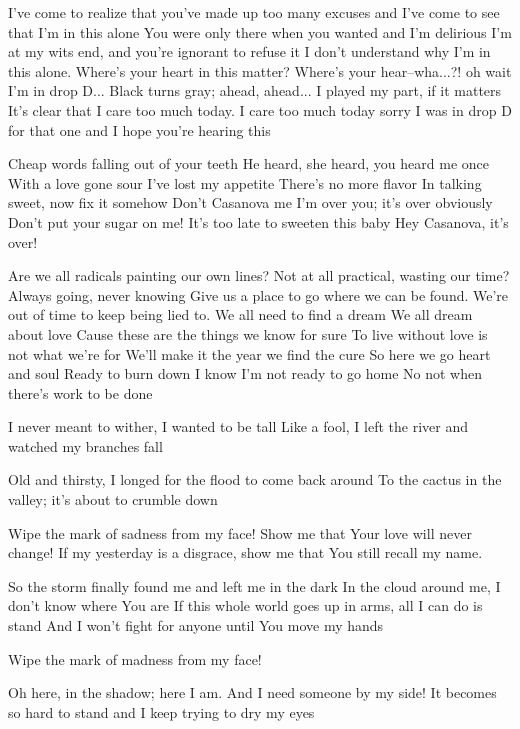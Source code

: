 I've come to realize that you've made up too many excuses
and I've come to see that I'm in this alone
You were only there when you wanted and I'm delirious
I'm at my wits end, and you're ignorant to refuse it
I don't understand why I'm in this alone.
Where's your heart in this matter?
Where's your hear--wha...?! oh wait I'm in drop D...
Black turns gray; ahead, ahead...
I played my part, if it matters
It's clear that I care too much today.
I care too much today
sorry I was in drop D for that one
and I hope you're hearing this


Cheap words falling out of your teeth
He heard, she heard, you heard me once
With a love gone sour
I've lost my appetite
There's no more flavor
In talking sweet, now fix it somehow
Don't Casanova me
I'm over you; it's over obviously
Don't put your sugar on me!
It's too late to sweeten this baby
Hey Casanova, it's over!


Are we all radicals painting our own lines?
Not at all practical, wasting our time?
Always going, never knowing
Give us a place to go where we can be found.
We're out of time to keep being lied to.
We all need to find a dream
We all dream about love
Cause these are the things we know for sure
To live without love is not what we're for
We'll make it the year we find the cure
So here we go heart and soul
Ready to burn down
I know I'm not ready to go home
No not when there's work to be done


I never meant to wither, I wanted to be tall
Like a fool, I left the river and watched my branches fall

Old and thirsty, I longed for the flood to come back around
To the cactus in the valley; it's about to crumble down

Wipe the mark of sadness from my face!
Show me that Your love will never change!
If my yesterday is a disgrace, show me that You still recall my name.

So the storm finally found me and left me in the dark
In the cloud around me, I don’t know where You are
If this whole world goes up in arms, all I can do is stand
And I won’t fight for anyone until You move my hands

Wipe the mark of madness from my face!

Oh here, in the shadow; here I am.
And I need someone by my side!
It becomes so hard to stand and I keep trying to dry my eyes

